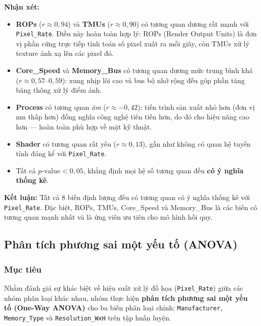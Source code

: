 \textbf{Nhận xét:}
\begin{itemize}
  \item \textbf{ROPs} ($r \approx 0{,}94$) và \textbf{TMUs} ($r \approx 0{,}90$)
        có tương quan dương rất mạnh với \texttt{Pixel\_Rate}. Điều này hoàn toàn
        hợp lý: ROPs (Render Output Units) là đơn vị phần cứng trực tiếp tính toán
        số pixel xuất ra mỗi giây, còn TMUs xử lý texture ánh xạ lên các pixel đó.
        
  \item \textbf{Core\_Speed} và \textbf{Memory\_Bus} có tương quan dương mức trung
        bình khá ($r \approx 0{,}57$--$0{,}59$): xung nhịp lõi cao và bus bộ nhớ rộng
        đều góp phần tăng băng thông xử lý điểm ảnh.

  \item \textbf{Process} có tương quan \emph{âm} ($r \approx -0{,}42$): tiến trình
        sản xuất nhỏ hơn (đơn vị nm thấp hơn) đồng nghĩa công nghệ tiên tiến hơn,
        do đó cho hiệu năng cao hơn --- hoàn toàn phù hợp về mặt kỹ thuật.

  \item \textbf{Shader} có tương quan rất yếu ($r \approx 0{,}13$), gần như
        không có quan hệ tuyến tính đáng kể với \texttt{Pixel\_Rate}.

  \item Tất cả $p\text{-value} < 0{,}05$, khẳng định mọi hệ số tương quan đều
        \textbf{có ý nghĩa thống kê}.
\end{itemize}

\textbf{Kết luận:} Tất cả 8 biến định lượng đều có tương quan có ý nghĩa thống kê
với \texttt{Pixel\_Rate}. Đặc biệt, ROPs, TMUs, Core\_Speed và Memory\_Bus là các
biến có tương quan mạnh nhất và là ứng viên ưu tiên cho mô hình hồi quy.

\subsection{Phân tích phương sai một yếu tố (ANOVA)}

\subsubsection{Mục tiêu}

Nhằm đánh giá sự khác biệt về hiệu suất xử lý đồ họa (\texttt{Pixel\_Rate}) giữa
các nhóm phân loại khác nhau, nhóm thực hiện \textbf{phân tích phương sai một yếu
tố (One-Way ANOVA)} cho ba biến phân loại chính: \texttt{Manufacturer},
\texttt{Memory\_Type} và \texttt{Resolution\_WxH} trên tập huấn luyện.


